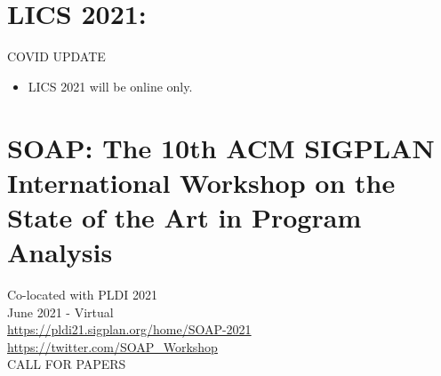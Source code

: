 \documentclass[prodmode,acmtecs]{acmsmall} %
\begin{document}
\section{LICS 2021:}\label{LICS2021}COVID UPDATE 

\begin{itemize}\item  LICS 2021 will be online only. 
 
\end{itemize}\section{SOAP: The 10th ACM SIGPLAN International Workshop on the State of the Art in Program Analysis }\label{SOAP}  Co-located with PLDI 2021\\ 
  June 2021 - Virtual\\ 
  \href{https://pldi21.sigplan.org/home/SOAP-2021}{https://pldi21.sigplan.org/home/SOAP-2021}\\ 
  \href{https://twitter.com/SOAP_Workshop}{https://twitter.com/SOAP\_Workshop}\\ 
CALL FOR PAPERS 
\end{document}
